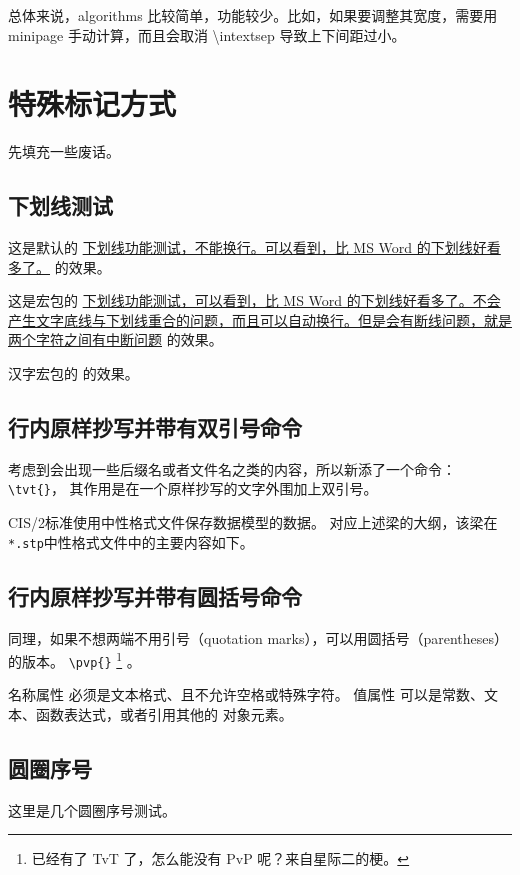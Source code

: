 \documentclass[../Main/thesis]{subfiles}
\begin{document}
总体来说，algorithms 比较简单，功能较少。比如，如果要调整其宽度，需要用 minipage 手动计算，而且会取消 \textbackslash intextsep 导致上下间距过小。

\section{特殊标记方式}
\label{sec:mark-methods}

先填充一些废话。\zhlipsum[9]

\subsection{下划线测试}
\label{ssc:underline}

这是默认的 \underline{下划线功能测试，不能换行。可以看到，比 MS Word 的下划线好看多了。} 的效果。

这是宏包的 \uline{下划线功能测试，可以看到，比 MS Word 的下划线好看多了。不会产生文字底线与下划线重合的问题，而且可以自动换行。但是会有断线问题，就是两个字符之间有中断问题} 的效果。

汉字宏包的  的效果。

\subsection{行内原样抄写并带有双引号命令}
\label{ssc:tvt}

考虑到会出现一些后缀名或者文件名之类的内容，所以新添了一个命令：
\verb|\tvt{}|，
其作用是在一个原样抄写的文字外围加上双引号。

CIS/2标准使用中性格式文件保存数据模型的数据。
对应上述梁的大纲，该梁在\texttt{*.stp}中性格式文件中的主要内容如下。

\subsection{行内原样抄写并带有圆括号命令}
\label{ssc:pvp}

同理，如果不想两端不用引号（quotation marks），可以用圆括号（parentheses）的版本。
\verb|\pvp{}|
\footnote{已经有了 TvT 了，怎么能没有 PvP 呢？来自星际二的梗。}
。

名称属性  必须是文本格式、且不允许空格或特殊字符。
值属性  可以是常数、文本、函数表达式，或者引用其他的 对象元素。

\subsection{圆圈序号}
这里是几个圆圈序号测试。
\end{document}
